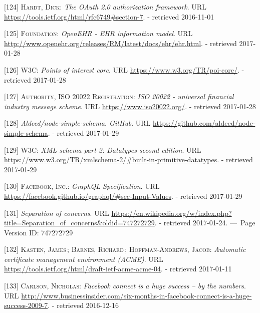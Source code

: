 \documentclass[12pt,english,a4paper,titlepage,cleardoublepage=empty,dottedtoc]{report}
\begin{document}
\hypertarget{ref-web_spec_oauth-2_access-verification}{}
{[}124{]} \textsc{Hardt, Dick}: \emph{The OAuth 2.0 authorization
framework}. URL \url{https://tools.ietf.org/html/rfc6749\#section-7}. -
retrieved 2016-11-01

\hypertarget{ref-web_spec_data-schemas_ehr}{}
{[}125{]} \textsc{Foundation}: \emph{OpenEHR - EHR information model}.
URL \url{http://www.openehr.org/releases/RM/latest/docs/ehr/ehr.html}. -
retrieved 2017-01-28

\hypertarget{ref-web_spec_data-schemas_poi}{}
{[}126{]} \textsc{W3C}: \emph{Points of interest core}. URL
\url{https://www.w3.org/TR/poi-core/}. - retrieved 2017-01-28

\hypertarget{ref-web_spec_data-schemas_bank-transfer}{}
{[}127{]} \textsc{Authority, ISO 20022 Registration}: \emph{ISO 20022 -
universal financial industry message scheme}. URL
\url{https://www.iso20022.org/}. - retrieved 2017-01-28

\hypertarget{ref-web_2017_repo_node-simple-schema}{}
{[}128{]} \emph{Aldeed/node-simple-schema. GitHub}. URL
\url{https://github.com/aldeed/node-simple-schema}. - retrieved
2017-01-29

\hypertarget{ref-web_spec_xml_types}{}
{[}129{]} \textsc{W3C}: \emph{XML schema part 2: Datatypes second
edition}. URL
\url{https://www.w3.org/TR/xmlschema-2/\#built-in-primitive-datatypes}.
- retrieved 2017-01-29

\hypertarget{ref-web_spec_graphql_types}{}
{[}130{]} \textsc{Facebook, Inc.}: \emph{GraphQL Specification}. URL
\url{https://facebook.github.io/graphql/\#sec-Input-Values}. - retrieved
2017-01-29

\hypertarget{ref-web_2016_wikipedia_separation-of-concerns}{}
{[}131{]} \emph{Separation of concerns}. URL
\url{https://en.wikipedia.org/w/index.php?title=Separation_of_concerns\&oldid=747272729}.
- retrieved 2017-01-24. ---~Page Version ID: 747272729

\hypertarget{ref-web_spec_acme}{}
{[}132{]} \textsc{Kasten, James}\,; \textsc{Barnes, Richard}\,;
\textsc{Hoffman-Andrews, Jacob}: \emph{Automatic certificate management
environment (ACME)}. URL
\url{https://tools.ietf.org/html/draft-ietf-acme-acme-04}. - retrieved
2017-01-11

\hypertarget{ref-web_2009-success-of-facebook-connect}{}
{[}133{]} \textsc{Carlson, Nicholas}: \emph{Facebook connect is a huge
success -- by the numbers}. URL
\url{http://www.businessinsider.com/six-months-in-facebook-connect-is-a-huge-success-2009-7}.
- retrieved 2016-12-16
\end{document}
